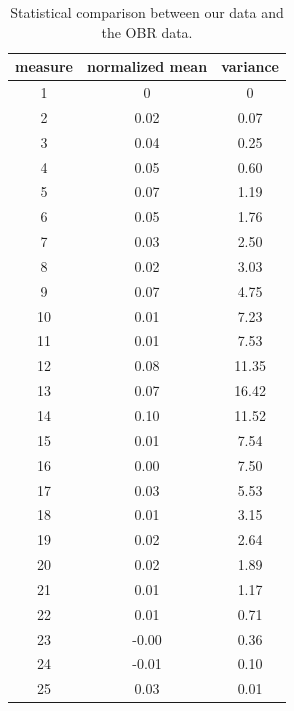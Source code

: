 \begin{table}[h]
\centering
 \begin{tabular}{c|c|c}
    measure & normalized mean & variance \\
    \hline
		1 &    0     &  0    \\
		2 &    0.02  &  0.07 \\
		3 &    0.04  &  0.25 \\
		4 &    0.05  &  0.60 \\
		5 &    0.07  &  1.19 \\
		6 &    0.05  &  1.76 \\
		7 &    0.03  &  2.50 \\
		8 &    0.02  &  3.03 \\
		9 &    0.07  &  4.75 \\
		10 &   0.01  &  7.23 \\
		11 &   0.01  &  7.53 \\
		12 &   0.08  & 11.35 \\
		13 &   0.07  & 16.42 \\
		14 &   0.10  & 11.52 \\
		15 &   0.01  &  7.54 \\
		16 &   0.00  &  7.50 \\
		17 &   0.03  &  5.53 \\
		18 &   0.01  &  3.15 \\
		19 &   0.02  &  2.64 \\
		20 &   0.02  &  1.89 \\
		21 &   0.01  &  1.17 \\
		22 &   0.01  &  0.71 \\
		23 &  -0.00  &  0.36 \\
		24 &  -0.01  &  0.10 \\
		25 &   0.03  &  0.01 \\
 \end{tabular}
\caption{Statistical comparison between our data and the OBR data.}
 \label{table:difference}
\end{table}
